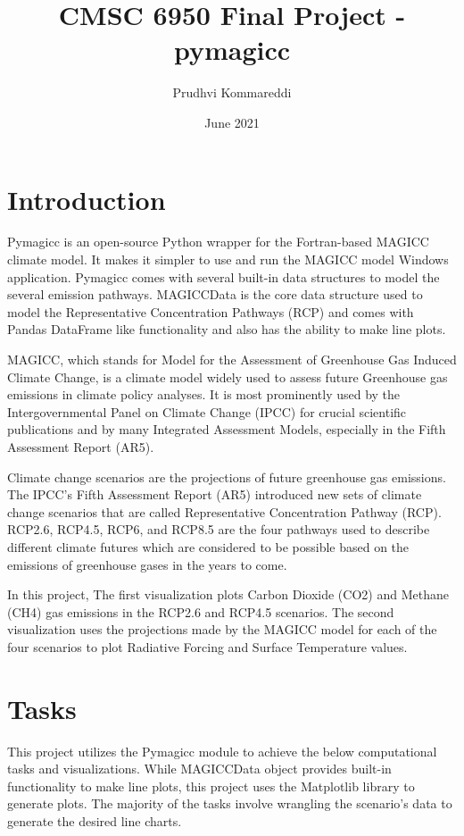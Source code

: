 \documentclass{article}
\title{CMSC 6950 Final Project - pymagicc}
\author{Prudhvi Kommareddi}
\date{June 2021}
\begin{document}
\maketitle

\section{Introduction}
Pymagicc\cite{Gieseke2018} is an open-source Python wrapper for the Fortran-based MAGICC climate model.
It makes it simpler to use and run the MAGICC model Windows application. Pymagicc comes with several
built-in data structures to model the several emission pathways. MAGICCData is the core data structure 
used to model the Representative Concentration Pathways (RCP) and comes with Pandas DataFrame like
functionality and also has the ability to make line plots.

MAGICC, which stands for Model for the Assessment of Greenhouse Gas Induced Climate Change, is a
climate model widely used to assess future Greenhouse gas emissions in climate policy analyses.
It is most prominently used by the Intergovernmental Panel on Climate Change (IPCC) for crucial scientific
publications and by many Integrated Assessment Models, especially in the Fifth Assessment Report (AR5).

Climate change scenarios are the projections of future greenhouse gas emissions. The IPCC's
Fifth Assessment Report (AR5) introduced new sets of climate change scenarios that are called
Representative Concentration Pathway (RCP). RCP2.6, RCP4.5, RCP6, and RCP8.5 are the four pathways
used to describe different climate futures which are considered to be possible based on the
emissions of greenhouse gases in the years to come.

In this project, The first visualization plots Carbon Dioxide (CO2) and Methane (CH4) gas emissions
in the RCP2.6 and RCP4.5 scenarios. The second visualization uses the projections made by the
MAGICC model for each of the four scenarios to plot Radiative Forcing and Surface Temperature
values.

\section{Tasks}
This project utilizes the Pymagicc module to achieve the below computational tasks and visualizations.
While MAGICCData object provides built-in functionality to make line plots, this project uses the
Matplotlib library to generate plots. The majority of the tasks involve wrangling the scenario's data
to generate the desired line charts.
\end{document}
